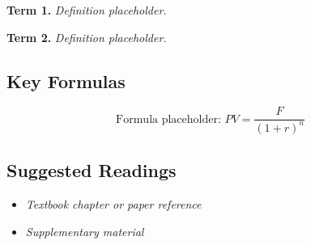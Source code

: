 \documentclass[
  letterpaper,
  DIV=11,
  numbers=noendperiod]{scrartcl}
\providecommand{\tightlist}{%
  \setlength{\itemsep}{0pt}\setlength{\parskip}{0pt}}
\begin{document}
\textbf{Term 1.} \emph{Definition placeholder.}

\textbf{Term 2.} \emph{Definition placeholder.}

\subsection{Key Formulas}\label{key-formulas}

\[
\text{Formula placeholder: } PV = \frac{F}{(1+r)^n}
\]

\subsection{Suggested Readings}\label{suggested-readings}

\begin{itemize}
\tightlist
\item
  \emph{Textbook chapter or paper reference}
\item
  \emph{Supplementary material}
\end{itemize}
\end{document}

